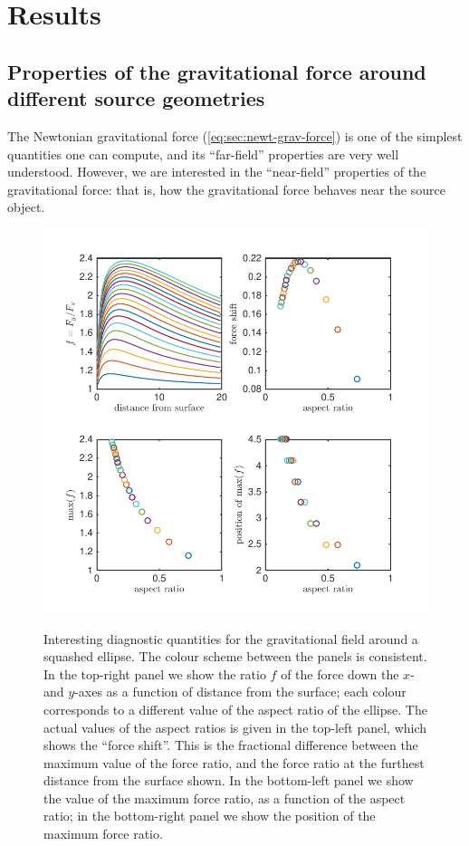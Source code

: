 \documentclass[amsmath,amssymb,10pt,eqsecnum, twocolumn]{revtex4}
\begin{document}
\section{Results}

\subsection{Properties of the gravitational force around different source geometries}
The Newtonian gravitational force (\ref{eq:sec:newt-grav-force}) is one of the simplest quantities one can compute, and its ``far-field'' properties are very well understood. However, we are interested in the ``near-field'' properties of the gravitational force: that is, how the gravitational force behaves near the source object.

\begin{figure}[!t]
      \begin{center}
{\includegraphics[scale=0.6,angle=0]{images/p2222}}
      \end{center}
\caption{ Interesting diagnostic quantities for the gravitational field around a squashed ellipse. The colour scheme between the panels is consistent. In the top-right panel we show the ratio $f$ of the force down the $x$- and $y$-axes as a function of distance from the surface; each colour corresponds to a different value of the aspect ratio of the ellipse. The actual values of the aspect ratios is given in the top-left panel, which shows the ``force shift''. This is the fractional difference between the maximum value of the force ratio, and the force ratio at the furthest distance from the surface shown. In the bottom-left panel we show the value of the maximum force ratio, as a function of the aspect ratio; in the bottom-right panel we show the position of the maximum force ratio. }\label{fig:squish-ellipse-grav}
\end{figure}
\end{document}
